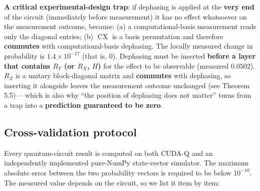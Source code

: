 \documentclass{article}
\begin{document}
\textbf{A critical experimental-design trap}: if dephasing is applied at
the \textbf{very end} of the circuit (immediately before measurement) it
has no effect whatsoever on the measurement outcome, because: (a) a
computational-basis measurement reads only the diagonal entries; (b)
\(\operatorname{CX}\) is a basis permutation and therefore
\textbf{commutes} with computational-basis dephasing. The locally
measured change in probability is \(1.4 \times 10^{- 17}\) (that is,
\(0\)). Dephasing must be inserted \textbf{before a layer that contains
\(R_{Y}\) (or \(R_{X}\), \(H\))} for the effect to be observable
(measured \(0.0502\)). \(R_{Z}\) is a unitary block-diagonal matrix and
\textbf{commutes} with dephasing, so inserting it alongside leaves the
measurement outcome unchanged (see Theorem 5.5)--- which is also why
``the position of dephasing does not matter'' turns from a trap into a
\textbf{prediction guaranteed to be zero}.

\subsection{Cross-validation protocol}

Every quantum-circuit result is computed on both CUDA-Q and an
independently implemented pure-NumPy state-vector simulator. The maximum
absolute error between the two probability vectors is required to be
below \(10^{- 10}\). The measured value depends on the circuit, so we
list it item by item:
\end{document}
